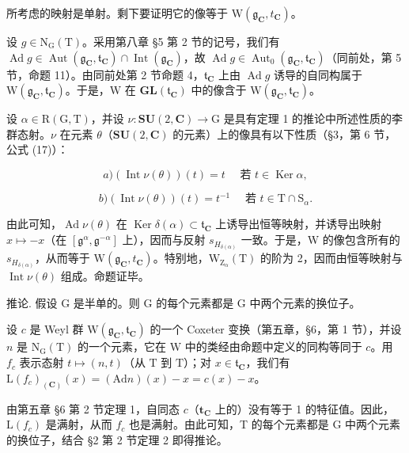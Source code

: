 所考虑的映射是单射。剩下要证明它的像等于 \(\mathrm{W}(\mathfrak{g}_{\mathbf{C}}, t_{\mathbf{C}})\)。

设 \(g \in \mathrm{N}_{\mathrm{G}}(\mathrm{T})\)。采用第八章 §5 第 2 节的记号，我们有 \(\operatorname{Ad} g \in \operatorname{Aut}(\mathfrak{g}_{\mathbf{C}}, \mathfrak{t}_{\mathbf{C}}) \cap \operatorname{Int}(\mathfrak{g}_{\mathbf{C}})\)，故 \(\operatorname{Ad} g \in \operatorname{Aut}_{0}(\mathfrak{g}_{\mathbf{C}}, \mathfrak{t}_{\mathbf{C}})\)（同前处，第 5 节，命题 11）。由同前处第 2 节命题 4，\(\mathfrak{t}_{\mathbf{C}}\) 上由 \(\operatorname{Ad} g\) 诱导的自同构属于 \(\mathrm{W}(\mathfrak{g}_{\mathbf{C}}, \mathfrak{t}_{\mathbf{C}})\)。于是，\(\mathrm{W}\) 在 \(\mathbf{GL}(\mathfrak{t}_{\mathbf{C}})\) 中的像含于 \(\mathrm{W}(\mathfrak{g}_{\mathbf{C}}, \mathfrak{t}_{\mathbf{C}})\)。

设 \(\alpha \in \mathrm{R}(\mathrm{G},\mathrm{T})\)，并设 \(\nu : \mathbf{SU}(2,\mathbf{C}) \to \mathrm{G}\) 是具有定理 1 的推论中所述性质的李群态射。\(\nu\) 在元素 \(\theta\)（\(\mathbf{SU}(2,\mathbf{C})\) 的元素）上的像具有以下性质（§3，第 6 节，公式 (17)）：

\[
a) (\operatorname{Int} \nu (\theta)) (t) = t \quad \text{ 若 } t \in \operatorname{Ker} \alpha ,
\]

\[
b) (\operatorname{Int} \nu (\theta)) (t) = t ^ {- 1} \quad \text{ 若 } t \in \mathrm{T} \cap \mathrm{S} _ {\alpha}.
\]

由此可知，\(\operatorname{Ad}\nu(\theta)\) 在 \(\operatorname{Ker}\delta(\alpha)\subset\mathfrak{t}_{\mathbf{C}}\) 上诱导出恒等映射，并诱导出映射 \(x\mapsto-x\)（在 \([\mathfrak{g}^{\alpha},\mathfrak{g}^{-\alpha}]\) 上），因而与反射 \(s_{H_{\delta(\alpha)}}\) 一致。于是，W 的像包含所有的 \(s_{H_{\delta(\alpha)}}\)，从而等于 \(\mathrm{W}(\mathfrak{g}_{\mathbf{C}}, t_{\mathbf{C}})\)。特别地，\(\mathrm{W}_{\mathrm{Z}_{\alpha}}(\mathrm{T})\) 的阶为 2，因而由恒等映射与 \(\operatorname{Int}\nu(\theta)\) 组成。命题证毕。

推论. 假设 G 是半单的。则 G 的每个元素都是 G 中两个元素的换位子。

设 \(c\) 是 Weyl 群 \(\mathrm{W}(\mathfrak{g}_{\mathbf{C}},\mathfrak{t}_{\mathbf{C}})\) 的一个 Coxeter 变换（第五章，§6，第 1 节），并设 \(n\) 是 \(\mathrm{N}_{\mathrm{G}}(\mathrm{T})\) 的一个元素，它在 \(\mathrm{W}\) 中的类经由命题中定义的同构等同于 \(c\)。用 \(f_{c}\) 表示态射 \(t\mapsto (n,t)\)（从 \(\mathrm{T}\) 到 \(\mathrm{T}\)）；对 \(x\in \mathfrak{t}_{\mathbf{C}}\)，我们有 \(\mathrm{L}(f_c)_{(\mathbf{C})}(x) = (\mathrm{Ad}n)(x) - x = c(x) - x\)。

由第五章 §6 第 2 节定理 1，自同态 \(c\)（\(\mathbf{t}_{\mathbf{C}}\) 上的）没有等于 1 的特征值。因此，\(\mathrm{L}(f_c)\) 是满射，从而 \(f_c\) 也是满射。由此可知，T 的每个元素都是 G 中两个元素的换位子，结合 §2 第 2 节定理 2 即得推论。

